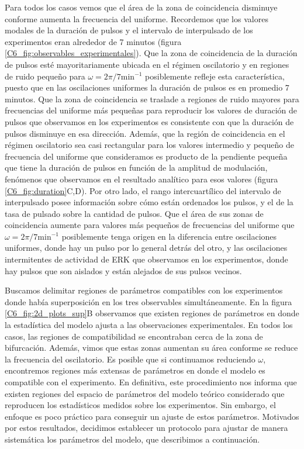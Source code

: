 \documentclass[./main.tex]{subfiles}
\begin{document}
Para todos los casos vemos que el área de la zona de coincidencia disminuye conforme aumenta la frecuencia del uniforme. Recordemos que los valores modales de la duración de pulsos y el intervalo de interpulsado de los experimentos eran alrededor de 7 minutos (figura \ref{C6_fig:observables_experimentales}). Que la zona de coincidencia de la duración de pulsos esté mayoritariamente ubicada en el régimen oscilatorio y en regiones de ruido pequeño para $\omega = 2\pi/7 \text{min}^{-1}$ posiblemente refleje esta característica, puesto que en las oscilaciones uniformes la duración de pulsos es en promedio 7 minutos. Que la zona de coincidencia se traslade a regiones de ruido mayores para frecuencias del uniforme más pequeñas para reproducir los valores de duración de pulsos que observamos en los experimentos es consistente con que la duración de pulsos disminuye en esa dirección. Además, que la región de coincidencia en el régimen oscilatorio sea casi rectangular para los valores intermedio y pequeño de frecuencia del uniforme que consideramos es producto de la pendiente pequeña que tiene la duración de pulsos en función de la amplitud de modulación, fenómenos que observamos en el resultado analítico para esos valores (figura \ref{C6_fig:duration}C,D). Por otro lado, el rango intercuartílico del intervalo de interpulsado posee información sobre cómo están ordenados los pulsos, y el de la tasa de pulsado sobre la cantidad de pulsos. Que el área de sus zonas de coincidencia aumente para valores más pequeños de frecuencias del uniforme que $\omega = 2\pi/7 \text{min}^{-1}$ posiblemente tenga origen en la diferencia entre oscilaciones uniformes, donde hay un pulso por lo general detrás del otro, y las oscilaciones intermitentes de actividad de ERK que observamos en los experimentos, donde hay pulsos que son aislados y están alejados de sus pulsos vecinos.  

Buscamos delimitar regiones de parámetros compatibles con los experimentos donde había superposición en los tres observables simultáneamente. En la figura \ref{C6_fig:2d_plots_sup}B observamos que existen regiones de parámetros en donde la estadística del modelo ajusta a las observaciones experimentales. En todos los casos, las regiones de compatibilidad se encontraban cerca de la zona de bifurcación. Además, vimos que estas zonas aumentan su área conforme se reduce la frecuencia del oscilatorio. Es posible que si continuamos reduciendo $\omega$, encontremos regiones más extensas de parámetros en donde el modelo es compatible con el experimento. En definitiva, este procedimiento nos informa que existen regiones del espacio de parámetros del modelo teórico considerado que reproducen los estadísticos medidos sobre los experimentos. Sin embargo, el enfoque es poco práctico para conseguir un ajuste de estos parámetros. Motivados por estos resultados, decidimos establecer un protocolo para ajustar de manera sistemática los parámetros del modelo, que describimos a continuación. 
\end{document}

